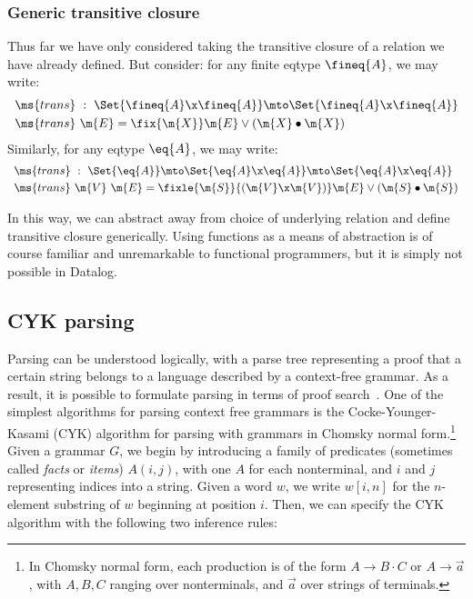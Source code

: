 
\subsubsection{Generic transitive closure}

Thus far we have only considered taking the transitive closure of a relation we
have already defined. But consider: for any finite eqtype $\fineq{A}$, we may
write:
\[\begin{array}{l}
\ms{trans} ~:~ \Set{\fineq{A} \x \fineq{A}} \mto \Set{\fineq{A} \x \fineq{A}}
\vspace{0.3em}\\
\ms{trans}\ \m{E} = \fix{\m{X}} \m{E} \vee (\m{X} \bullet \m{X})
\end{array}\]
Similarly, for any eqtype $\eq{A}$, we may write:
\[\begin{array}{l}
\ms{trans} ~:~
\Set{\eq{A}} \mto \Set{\eq{A} \x \eq{A}} \mto \Set{\eq{A} \x \eq{A}}
\vspace{0.3em}\\
\ms{trans}\ \m{V}\ \m{E} = %
\fixle{\m{S}}{(\m{V} \x \m{V})} \m{E} \vee (\m{S} \bullet \m{S})
\end{array}\]

In this way, we can abstract away from choice of underlying relation and define
transitive closure generically. Using functions as a means of abstraction is of
course familiar and unremarkable to functional programmers, but it is simply not
possible in Datalog.


\subsection{CYK parsing}
Parsing can be understood logically, with a parse tree representing a
proof that a certain string belongs to a language described by a
context-free grammar. As a result, it is possible to formulate parsing
in terms of proof search~\cite{deductive-parsing}. One of the
simplest algorithms for parsing context free grammars is the
Cocke-Younger-Kasami (CYK) algorithm for parsing with grammars in
Chomsky normal form.\footnote{In Chomsky normal form, each production
  is of the form $A \to B \cdot C$ or $A \to \vec{a}$, with $A,B,C$
  ranging over nonterminals, and $\vec{a}$ over strings of
  terminals.}  Given a grammar $G$, we begin by introducing a family
of predicates (sometimes called \emph{facts} or \emph{items}) $A(i,j)$,
with one $A$ for each nonterminal, and $i$ and $j$ representing
indices into a string. Given a word $w$, we write $w[i,n]$ for the
$n$-element substring of $w$ beginning at position $i$. Then, we can
specify the CYK algorithm with the following two inference rules:

